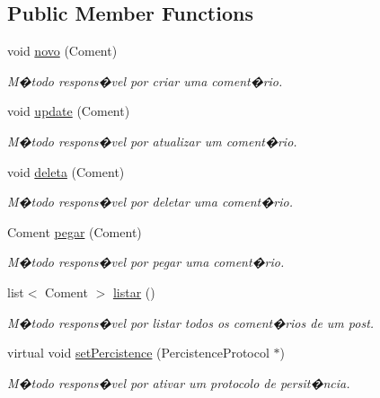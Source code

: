 \subsection*{Public Member Functions}
\begin{DoxyCompactItemize}
\item 
void \hyperlink{class_l_n_coment_a0c4839930f9a6d65f6200845fdab9750}{novo} (Coment)
\begin{DoxyCompactList}\small\item\em M�todo respons�vel por criar uma coment�rio. \end{DoxyCompactList}\item 
void \hyperlink{class_l_n_coment_acefe80ac606f9258093f22eca0759cb0}{update} (Coment)
\begin{DoxyCompactList}\small\item\em M�todo respons�vel por atualizar um coment�rio. \end{DoxyCompactList}\item 
void \hyperlink{class_l_n_coment_abf2ff1565521a03e001ff907eeec7fe9}{deleta} (Coment)
\begin{DoxyCompactList}\small\item\em M�todo respons�vel por deletar uma coment�rio. \end{DoxyCompactList}\item 
Coment \hyperlink{class_l_n_coment_a321fb89a92d2af289267c0ccac1c090f}{pegar} (Coment)
\begin{DoxyCompactList}\small\item\em M�todo respons�vel por pegar uma coment�rio. \end{DoxyCompactList}\item 
list$<$ Coment $>$ \hyperlink{class_l_n_coment_aebcc6610b6b288196ce101440a817c3d}{listar} ()
\begin{DoxyCompactList}\small\item\em M�todo respons�vel por listar todos os coment�rios de um post. \end{DoxyCompactList}\item 
virtual void \hyperlink{class_l_n_coment_abdf75faf2dc51482a09958f78095b008}{set\-Percistence} (Percistence\-Protocol $\ast$)
\begin{DoxyCompactList}\small\item\em M�todo respons�vel por ativar um protocolo de persit�ncia. \end{DoxyCompactList}\end{DoxyCompactItemize}


